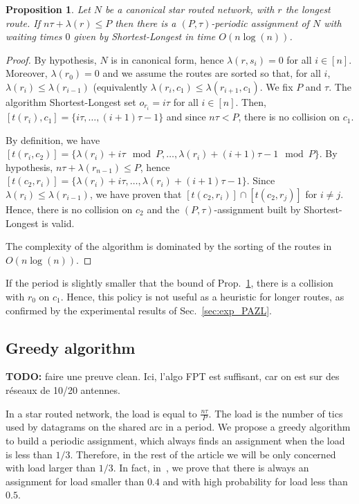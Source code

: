 \documentclass[a4paper,10pt]{article}
\newtheorem{proposition}{Proposition}
\begin{document}
      \begin{proposition} Let $N$ be a canonical star routed network, with $r$ the longest route. If $n\tau + \lambda(r) \leq P$ then there is a $(P,\tau)$-periodic assignment of $N$ with waiting times $0$ given by Shortest-Longest in time $O(n\log(n))$.\label{prop:SL}
      \end{proposition}
      \begin{proof}
       By hypothesis, $N$ is in canonical form, hence $\lambda(r,s_i) = 0$ for all $i \in [n]$. Moreover, $\lambda(r_0) = 0$ and we assume the routes are sorted so that, for all $i$, $\lambda(r_i) \leq \lambda(r_{i-1})$ (equivalently $\lambda(r_i,c_1) \leq \lambda(r_{i+1},c_1)$. We fix $P$ and $\tau$. The algorithm Shortest-Longest set $o_{r_i} = i\tau$ for all $i \in [n]$. Then, $[t(r_{i}),c_1] = \{i\tau,\dots, (i+1)\tau -1\}$ and since $n\tau < P$, there is no collision on $c_1$. 

       By definition, we have  $[t(r_{i},c_2)] = \{\lambda(r_{i}) + i\tau \mod P, \dots, \lambda(r_{i}) + (i+1)\tau -1 \mod P\}$. By hypothesis, $n\tau + \lambda(r_{n-1}) \leq P$, hence $[t(c_2,r_{i})] = \{\lambda(r_{i}) + i\tau, \dots, \lambda(r_{i}) + (i+1)\tau -1\}$. Since  $\lambda(r_i) \leq \lambda(r_{i-1})$, we have proven that $[t(c_2,r_{i})] \cap [t(c_2,r_{j})]$ for $i \neq j$. Hence, there is no collision on $c_2$ and the $(P,\tau)$-assignment built by Shortest-Longest is valid.

 		The complexity of the algorithm is dominated by the sorting of the routes in $O(n\log(n))$. 
      \end{proof}

      If the period is slightly smaller that the bound of Prop.~\ref{prop:SL}, there is a collision with $r_0$ on $c_1$. Hence, this policy is not useful as a heuristic for longer routes, as confirmed by the experimental results of Sec.~\ref{sec:exp_PAZL}. 

   
    \subsection{Greedy algorithm}
    
    \textbf{TODO:} faire une preuve clean. Ici, l'algo FPT est suffisant, car 
    on est sur des réseaux de 10/20 antennes.
    
      In a star routed network, the load is equal to $\frac{n\tau}{P}$. The load is the number of tics used by datagrams on the shared arc in a period. We propose a greedy algorithm to build a periodic assignment, which always finds an assignment when the load is less than $1/3$. Therefore, in the rest of the article we will be only concerned with load larger than $1/3$. In fact, in~\cite{guiraud2020scheduling}, we prove that there is always an assignment for load smaller than $0.4$ and with high probability for load less than $0.5$.
\end{document}
